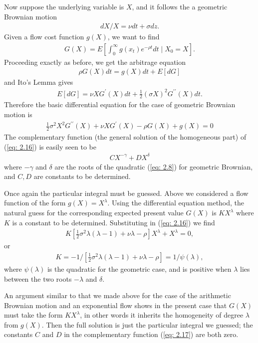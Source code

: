 \documentclass[\topdir/lecture\_notes.tex]{subfiles}
\begin{document}
\begin{optional}
Now suppose the underlying variable is $X$, and it follows the a geometric Brownian motion
\begin{align*}
dX / X=\nu dt+\sigma d z.
\end{align*}
Given a flow cost function $g(X)$, we want to find
\begin{align}
G(X)=E\left[\int_{0}^{\infty} g(x_{t}) e^{-\rho t} dt \mid X_{0}=X\right]. \label{eq: 2.15}
\end{align}
Proceeding exactly as before, we get the arbitrage equation
\begin{align*}
\rho G(X) dt=g(X) dt+E[dG]
\end{align*}
and Ito's Lemma gives
\begin{align*}
E[dG]=\nu X G^{\prime}(X) dt+\frac{1}{2}(\sigma X)^{2} G^{\prime \prime}(X) dt.
\end{align*}
Therefore the basic differential equation for the case of geometric Brownian motion is
\begin{align}
\frac{1}{2} \sigma^{2} X^{2} G^{\prime \prime}(X)+\nu X G^{\prime}(X)-\rho G(X)+g(X)=0 \label{eq: 2.16}
\end{align}
The complementary function (the general solution of the homogeneous part) of (\ref{eq: 2.16}) is easily seen to be
\begin{align}
C X^{-\gamma}+D X^{\delta} \label{eq: 2.17}
\end{align}
where $-\gamma$ and $\delta$ are the roots of the quadratic (\ref{eq: 2.8}) for geometric Brownian, and $C, D$ are constants to be determined.

Once again the particular integral must be guessed. Above we considered a flow function of the form $g(X)=X^{\lambda}$. Using the differential equation method, the natural guess for the corresponding expected present value $G(X)$ is $K X^{\lambda}$ where $K$ is a constant to be determined. Substituting in (\ref{eq: 2.16}) we find
\begin{align*}
K\left[\frac{1}{2} \sigma^{2} \lambda(\lambda-1)+\nu \lambda-\rho\right] X^{\lambda}+X^{\lambda}=0,
\end{align*}
or
\begin{align*}
K=-1 /\left[\frac{1}{2} \sigma^{2} \lambda(\lambda-1)+\nu \lambda-\rho\right]=1 / \psi(\lambda),
\end{align*}
where $\psi(\lambda)$ is the quadratic for the geometric case, and is positive when $\lambda$ lies between the two roots $-\lambda$ and $\delta$.

An argument similar to that we made above for the case of the arithmetic Brownian motion and an exponential flow shows in the present case that $G(X)$ must take the form $K X^{\lambda}$, in other words it inherits the homogeneity of degree $\lambda$ from $g(X)$. Then the full solution is just the particular integral we guessed; the constants $C$ and $D$ in the complementary function (\ref{eq: 2.17}) are both zero.


\end{optional}
\end{document}
